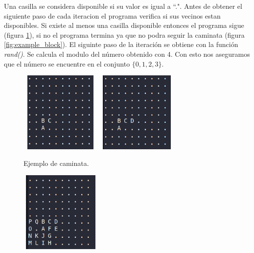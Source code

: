 Una casilla se considera disponible si su valor es igual a ``.". Antes de obtener el siguiente paso de cada iteracion el programa verifica si sus vecinos estan disponibles. Si existe al menos una casilla disponible entonces el programa sigue (figura \ref{fig:example_walk}), si no el programa termina ya que no podra seguir la caminata (figura \ref{fig:example_block}). El siguinte paso de la iteración se obtiene con la función \textit{rand()}. Se calcula el modulo del número obtenido con 4. Con esto nos aseguramos que el número se encuentre en el conjunto $\{0, 1, 2 ,3\}$.
\begin{center}
    \begin{minipage}{0.48\linewidth}
        \begin{figure}[H]
            \centering
            \includegraphics[width=4cm,height=4cm]{Graphics/example_2_1_problem1.png}
            \includegraphics[width=4cm,height=4cm]{Graphics/example_2_2_problem1.png}
            \caption{Ejemplo de caminata.}
            \label{fig:example_walk}
        \end{figure}
    \end{minipage}
    \begin{minipage}{0.48\linewidth}
        \begin{figure}[H]
            \centering
            \includegraphics[width=4cm,height=4cm]{Graphics/example_3_1_problem1.png}

\end{figure}
\end{minipage}
\end{center}
